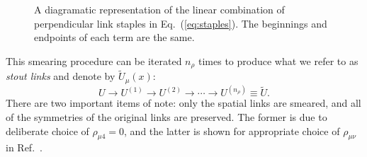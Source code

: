     \begin{figure}
        \centering
        \caption[A diagramatic representation of the linear combination of perpendicular link staples in Eq.~(\ref{eq:staples}).]{A diagramatic representation of the linear combination of perpendicular link staples in Eq.~(\ref{eq:staples}). The beginnings and endpoints of each term are the same.}
        \label{fig:staples}
    \end{figure}
    This smearing procedure can be iterated $n_\rho$ times to produce what we refer to as \textit{stout links} and denote by $\widetilde{U}_\mu(x)$:
    \begin{equation}
        U \rightarrow U^{(1)} \rightarrow U^{(2)} \rightarrow \cdots \rightarrow U^{\left(n_{\rho}\right)} \equiv \widetilde{U}.
    \end{equation}
    There are two important items of note: only the spatial links are smeared, and all of the symmetries of the original links are preserved. The former is due to deliberate choice of $\rho_{\mu 4} = 0$, and the latter is shown for appropriate choice of $\rho_{\mu \nu}$ in Ref.~\cite{Morningstar:2003gk}.
    
